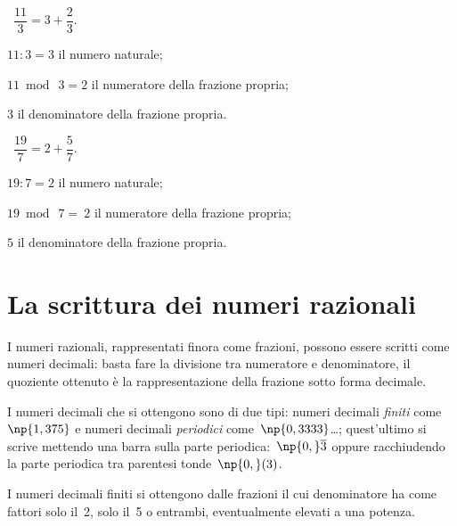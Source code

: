 \begin{exrig}
 \begin{esempio}
 ~$\dfrac{11}{3}=3+\dfrac{2}{3}$.
  \begin{itemize*}
   \item $11:3 =3$ il numero naturale;
   \item $11\bmod~3 =2$ il numeratore della frazione propria;
   \item $3$ il denominatore della frazione propria.
  \end{itemize*}
 \end{esempio}

 \begin{esempio}
 ~$\dfrac{19}{7}=2+\dfrac{5}{7}$.
  \begin{itemize*}
   \item $19:7=2$ il numero naturale;
   \item $19\bmod~7 =~2$ il numeratore della frazione propria;
   \item $5$ il denominatore della frazione propria.
  \end{itemize*}
 \end{esempio}
\end{exrig}

\ovalbox{\risolvi \ref{ese:3.22}}

\section{La scrittura dei numeri razionali}

I numeri razionali, rappresentati finora come frazioni, possono essere scritti come numeri decimali:
basta fare la divisione tra numeratore e denominatore, il quoziente ottenuto è la
rappresentazione della frazione sotto forma decimale.

\begin{center}
 
\end{center}

I numeri decimali che si ottengono sono di due tipi: numeri decimali \emph{finiti} come~$\np{1,375}$ e
numeri decimali \emph{periodici} come~$\np{0,3333}$\ldots;
quest'ultimo si scrive mettendo una barra sulla parte periodica:~$\np{0,}\overline3$ oppure racchiudendo la parte periodica
tra parentesi tonde~$\np{0,}(3)$.

I numeri decimali finiti si ottengono dalle frazioni il cui denominatore ha come fattori solo il~2,
solo il~5 o entrambi, eventualmente elevati a una potenza.

